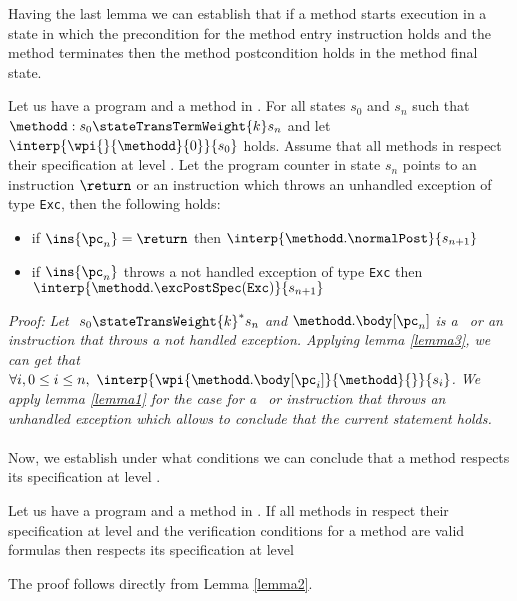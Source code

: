 Having the last lemma we can  establish that if a method starts
execution in a state in which the \fwpi{} precondition  for the method entry instruction 
holds and the method terminates then the method postcondition holds in the method final state.

\begin{lemma}\label{lemma2}
Let us have a program \Program{} and a method \methodd{} in \Program.
For all states $s_0$ and $s_n$ such that   $\methodd : s_0  \stateTransTermWeight{k} s_n $
and let $\interp{ \wpi{} {\methodd}{0}}{ s_{0}}$ holds. Assume that
  all methods in \Program{} respect their specification at level . 
Let the program counter in state $s_n$ points to an instruction $\return $ or
 an instruction which throws an unhandled exception of type \mbox{\rm\texttt{Exc}}, then  the following holds:
\begin{itemize}
    \item if $\ins{\pc_n} = \return $ then $\interp{ \methodd.\normalPost}{s_{n+1}}$
    \item  if $\ins{\pc_n}$ throws a not handled exception of type \mbox{\rm\texttt{Exc}} then \\ 
             $\interp{ \methodd.\excPostSpec(\mbox{\rm\texttt{Exc}}  )}{s_{n+1}}$
\end{itemize}
\end{lemma}
\textit{Proof:} 
\textit{Let $ \ s_{0} \stateTransWeight{k}^{*} s_n $ and $\methodd.\body[\pc_n]$ is a \return \ or an instruction that throws a  not handled exception.
 Applying lemma \ref{lemma3}, we can get that $\forall i, 0 \le i \le n , \ \interp{ \wpi{\methodd.\body[\pc_i] } {\methodd}{ } }{ s_{i}}$. 
We apply lemma \ref{lemma1} for the case for a \return \ or instruction that throws an unhandled exception which allows to conclude that the current statement holds.
}\\
\Qed\\

Now, we establish under what conditions we can conclude that a method respects its specification at level .
\begin{lemma}\label{lemmaMethRespSpec}
Let us have a program \Program{} and a method \methodd{} in \Program.
If  all methods in \Program{} respect their specification at level  
and the verification conditions for a method  \methodd{} are valid formulas then 
\methodd{}  respects its specification at level  
\end{lemma} The proof  follows directly from Lemma \ref{lemma2}.




